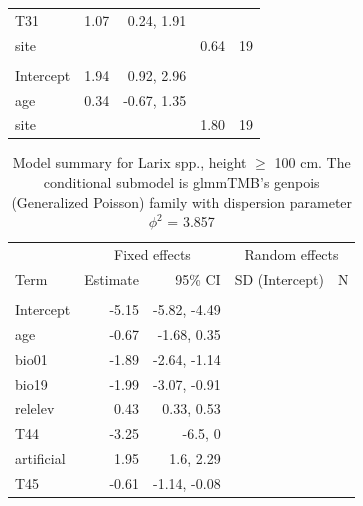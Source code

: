 \documentclass[
]{article}
\begin{document}
\begin{longtable}[t]{lrrrr}
\hspace{1em}T31 & 1.07 & 0.24, 1.91 &  & \\
\hspace{1em}site &  &  & 0.64 & 19\\
\addlinespace[0.3em]
\multicolumn{5}{l}{\textbf{Zero-inflation model}}\\
\hspace{1em}Intercept & 1.94 & 0.92, 2.96 &  & \\
\hspace{1em}age & 0.34 & -0.67, 1.35 &  & \\
\hspace{1em}site &  &  & 1.80 & 19\\
\bottomrule
\end{longtable}

\begin{longtable}[t]{lrrrr}
\caption{\label{tab:summaries-tables}\label{tab:L2}Model summary for Larix spp., height $\geq$ 100 cm. The conditional submodel is glmmTMB's genpois (Generalized Poisson) family with dispersion parameter $\phi^{2}$ = 3.857}\\
\toprule
\multicolumn{1}{c}{ } & \multicolumn{2}{c}{Fixed effects} & \multicolumn{2}{c}{Random effects} \\
\cmidrule(l{3pt}r{3pt}){2-3} \cmidrule(l{3pt}r{3pt}){4-5}
Term & Estimate & 95\% CI & SD (Intercept) & N\\
\midrule
\addlinespace[0.3em]
\multicolumn{5}{l}{\textbf{Conditional model}}\\
\hspace{1em}Intercept & -5.15 & -5.82, -4.49 &  & \\
\hspace{1em}age & -0.67 & -1.68, 0.35 &  & \\
\hspace{1em}bio01 & -1.89 & -2.64, -1.14 &  & \\
\hspace{1em}bio19 & -1.99 & -3.07, -0.91 &  & \\
\hspace{1em}relelev & 0.43 & 0.33, 0.53 &  & \\
\hspace{1em}T44 & -3.25 & -6.5, 0 &  & \\
\hspace{1em}artificial & 1.95 & 1.6, 2.29 &  & \\
\hspace{1em}T45 & -0.61 & -1.14, -0.08 &  & \\

\end{longtable}
\end{document}
